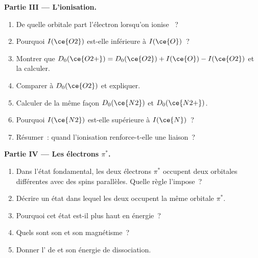 \begin{problem}
\medskip
\noindent\textbf{Partie III --- L'ionisation.}
\begin{enumerate}[resume]
  \item De quelle orbitale part l'électron lorsqu'on ionise ~?
  \item Pourquoi $I(\ce{O2})$ est-elle inférieure à $I(\ce{O})$~?
  \item Montrer que $D_0(\ce{O2+}) = D_0(\ce{O2}) + I(\ce{O}) - I(\ce{O2})$ et la calculer.
  \item Comparer à $D_0(\ce{O2})$ et expliquer.
  \item Calculer de la même façon $D_0(\ce{N2})$ et $D_0(\ce{N2+})$.
  \item Pourquoi $I(\ce{N2})$ est-elle supérieure à $I(\ce{N})$~?
  \item Résumer~: quand l'ionisation renforce-t-elle une liaison~?
\end{enumerate}

\medskip
\noindent\textbf{Partie IV --- Les électrons $\pi^*$.}
\begin{enumerate}[resume]
  \item Dans l'état fondamental, les deux électrons $\pi^*$ occupent deux orbitales différentes avec
        des spins parallèles. Quelle règle l'impose~?
  \item Décrire un état dans lequel les deux occupent la même orbitale $\pi^*$.
  \item Pourquoi cet état est-il plus haut en énergie~?
  \item Quels sont son  et son magnétisme~?
  \item Donner l' de  et son énergie de dissociation.
\end{enumerate}
\end{problem}
